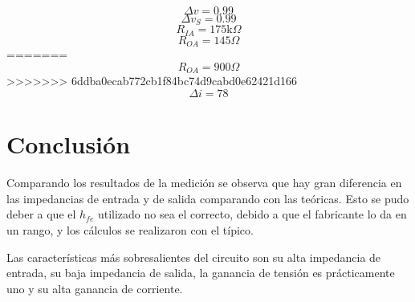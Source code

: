 \documentclass[../../main.tex]{subfiles}
\begin{document}
$$\Delta v = 0.99$$
$$ \Delta v_S =0.99 $$
$$ R_{IA} = 175\mathrm{k}\Omega $$
$$R_{OA}=145\Omega $$
=======
$$R_{OA}=900\Omega $$
>>>>>>> 6ddba0ecab772cb1f84bc74d9cabd0e62421d166
$$\Delta i= 78 $$


\section{Conclusión}
Comparando los resultados de la medición se observa que hay gran diferencia en las impedancias de entrada y de salida comparando con las te\'oricas. Esto se pudo deber a que el $h_{fe}$ utilizado no sea el correcto, debido a que el fabricante lo da en un rango, y los cálculos se realizaron con el t\'ipico. 
\par Las características más sobresalientes del circuito son su alta impedancia de entrada, su baja impedancia de salida, la ganancia de tensión es prácticamente uno y su alta ganancia de corriente.
\end{document}
